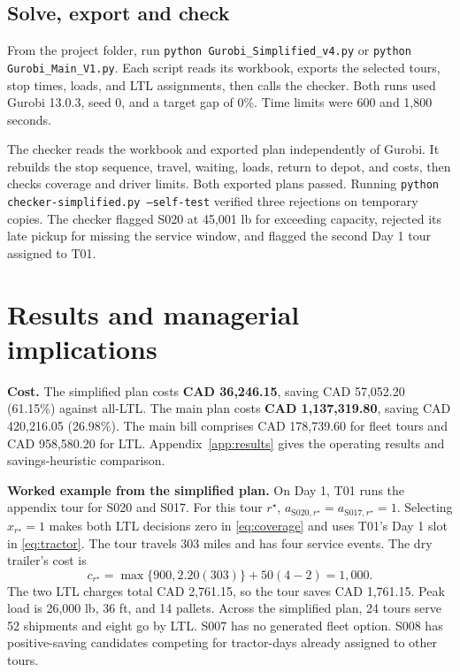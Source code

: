 \documentclass[11pt,letterpaper]{article}
\newcommand{\code}[1]{\texttt{#1}}
\begin{document}
\subsection*{Solve, export and check}

From the project folder, run \code{python Gurobi\_Simplified\_v4.py}
or \code{python Gurobi\_Main\_V1.py}. Each script reads its workbook,
exports the selected tours, stop times, loads, and LTL assignments,
then calls the checker. Both runs used Gurobi 13.0.3, seed 0, and a
target gap of 0\%. Time limits were 600 and 1,800 seconds.

The checker reads the workbook and exported plan independently of
Gurobi. It rebuilds the stop sequence, travel, waiting, loads, return
to depot, and costs, then checks coverage and driver limits. Both
exported plans passed.
Running \code{python checker-simplified.py --self-test} verified
three rejections on temporary copies. The checker flagged S020 at
45,001 lb for exceeding capacity, rejected its late pickup for missing
the service window, and flagged the second Day 1 tour assigned to T01.

\newpage
\section{Results and managerial implications}

\textbf{Cost.} The simplified plan costs \textbf{CAD 36,246.15},
saving CAD 57,052.20 (61.15\%) against all-LTL. The main plan costs
\textbf{CAD 1,137,319.80}, saving CAD 420,216.05 (26.98\%).
The main bill comprises CAD 178,739.60 for fleet tours and
CAD 958,580.20 for LTL. Appendix~\ref{app:results} gives the
operating results and savings-heuristic comparison.

\textbf{Worked example from the simplified plan.} On Day 1, T01 runs
the appendix tour for S020 and S017. For this tour \(r^\star\),
\(a_{\mathrm{S020},r^\star}=a_{\mathrm{S017},r^\star}=1\). Selecting
\(x_{r^\star}=1\) makes both LTL decisions zero in \eqref{eq:coverage}
and uses T01's Day 1 slot in \eqref{eq:tractor}. The tour travels
303 miles and has four service events. The dry trailer's cost is
\[
c_{r^\star}=\max\{900,2.20(303)\}+50(4-2)=1{,}000.
\]
The two LTL charges total CAD 2,761.15, so the tour saves CAD 1,761.15.
Peak load is 26,000 lb, 36 ft, and 14 pallets. Across the simplified
plan, 24 tours serve 52 shipments and eight go by LTL. S007 has no
generated fleet option. S008 has positive-saving candidates competing
for tractor-days already assigned to other tours.
\end{document}
